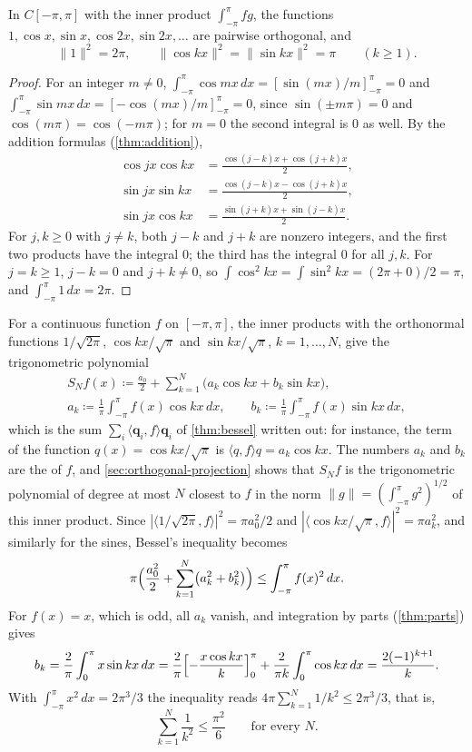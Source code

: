 \begin{proposition}
\label{prop:trig-orthogonal}
In $C[-\pi,\pi]$ with the inner product $\int_{-\pi}^\pi fg$, the functions $1,\cos x,\sin x,\cos2x,\sin2x,\ldots$ are pairwise orthogonal, and
\[
\|1\|^2=2\pi,\qquad\|\cos kx\|^2=\|\sin kx\|^2=\pi\qquad(k\ge1).
\]
\end{proposition}

\begin{proof}
For an integer $m\ne0$, $\int_{-\pi}^\pi\cos mx\,dx=[\sin(mx)/m]_{-\pi}^{\pi}=0$ and $\int_{-\pi}^\pi\sin mx\,dx=[-\cos(mx)/m]_{-\pi}^{\pi}=0$, since $\sin(\pm m\pi)=0$ and $\cos(m\pi)=\cos(-m\pi)$; for $m=0$ the second integral is $0$ as well. By the addition formulas (\cref{thm:addition}),
\[
\begin{aligned}
\cos jx\cos kx&=\frac{\cos(j-k)x+\cos(j+k)x}2,\\
\sin jx\sin kx&=\frac{\cos(j-k)x-\cos(j+k)x}2,\\
\sin jx\cos kx&=\frac{\sin(j+k)x+\sin(j-k)x}2 .
\end{aligned}
\]
For $j,k\ge0$ with $j\ne k$, both $j-k$ and $j+k$ are nonzero integers, and the first two products have the integral $0$; the third has the integral $0$ for all $j,k$. For $j=k\ge1$, $j-k=0$ and $j+k\ne0$, so $\int\cos^2kx=\int\sin^2kx=(2\pi+0)/2=\pi$, and $\int_{-\pi}^\pi1\,dx=2\pi$.
\end{proof}

For a continuous function $f$ on $[-\pi,\pi]$, the inner products with the orthonormal functions $1/\sqrt{2\pi}$, $\cos kx/\sqrt\pi$ and $\sin kx/\sqrt\pi$, $k=1,\ldots,N$, give the trigonometric polynomial
\[
\begin{gathered}
S_Nf(x)\coloneqq\frac{a_0}2+\sum_{k=1}^N\bigl(a_k\cos kx+b_k\sin kx\bigr),\\
a_k\coloneqq\frac1\pi\int_{-\pi}^\pi f(x)\cos kx\,dx,\qquad b_k\coloneqq\frac1\pi\int_{-\pi}^\pi f(x)\sin kx\,dx,
\end{gathered}
\]
which is the sum $\sum_i\langle\mathbf q_i,f\rangle\mathbf q_i$ of \cref{thm:bessel} written out: for instance, the term of the function $q(x)=\cos kx/\sqrt\pi$ is $\langle q,f\rangle q=a_k\cos kx$. The numbers $a_k$ and $b_k$ are the  of $f$, and \cref{sec:orthogonal-projection} shows that $S_Nf$ is the trigonometric polynomial of degree at most $N$ closest to $f$ in the norm $\|g\|=(\int_{-\pi}^\pi g^2)^{1/2}$ of this inner product. Since $|\langle1/\sqrt{2\pi},f\rangle|^2=\pi a_0^2/2$ and $|\langle\cos kx/\sqrt\pi,f\rangle|^2=\pi a_k^2$, and similarly for the sines, Bessel's inequality becomes
\[
\pi\Bigl(\frac{a_0^2}2+\sum_{k=1}^N\bigl(a_k^2+b_k^2\bigr)\Bigr)\le\int_{-\pi}^\pi f(x)^2\,dx .
\]
For $f(x)=x$, which is odd, all $a_k$ vanish, and integration by parts (\cref{thm:parts}) gives
\[
b_k=\frac2\pi\int_0^\pi x\sin kx\,dx=\frac2\pi\Bigl[-\frac{x\cos kx}k\Bigr]_0^\pi+\frac2{\pi k}\int_0^\pi\cos kx\,dx=\frac{2(-1)^{k+1}}k .
\]
With $\int_{-\pi}^\pi x^2\,dx=2\pi^3/3$ the inequality reads $4\pi\sum_{k=1}^N1/k^2\le2\pi^3/3$, that is,
\[
\sum_{k=1}^N\frac1{k^2}\le\frac{\pi^2}6\qquad\text{for every }N .
\]

